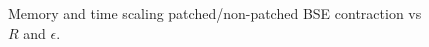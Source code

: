 \begin{figure}[ht!]
    \caption{Memory and time scaling patched/non-patched BSE contraction vs $R$ and $\epsilon$.}
\end{figure}













